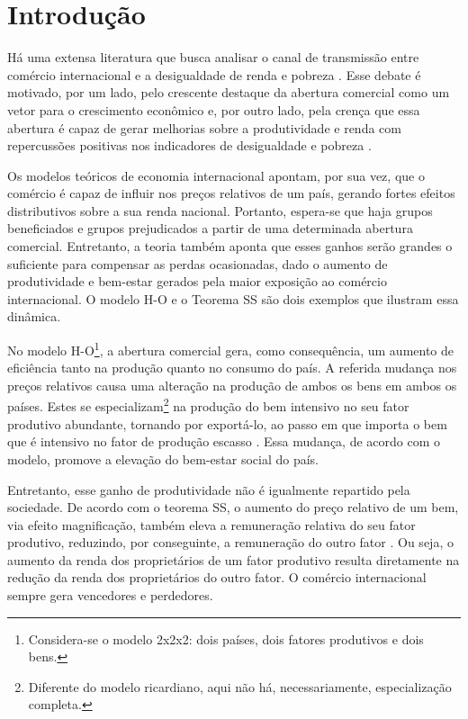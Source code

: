 

\chapter{Introdução} \label{cha:introducao}

Há uma extensa literatura que busca analisar o canal de transmissão entre comércio internacional e a desigualdade de renda e pobreza \cite{ferreira06, castilho12, bayar17, anderson20}. Esse debate é motivado, por um lado, pelo crescente destaque da abertura comercial como um vetor para o crescimento econômico \cite{atkin22} e, por outro lado, pela crença que essa abertura é capaz de gerar melhorias sobre a produtividade e renda com repercussões positivas nos indicadores de desigualdade e pobreza \cite{carneiro06}.

Os modelos teóricos de economia internacional apontam, por sua vez, que o comércio é capaz de influir nos preços relativos de um país, gerando fortes efeitos distributivos sobre a sua renda nacional. Portanto, espera-se que haja grupos beneficiados e grupos prejudicados a partir de uma determinada abertura comercial. Entretanto, a teoria também aponta que esses ganhos serão grandes o suficiente para compensar as perdas ocasionadas, dado o aumento de produtividade e bem-estar gerados pela maior exposição ao comércio internacional. O modelo H-O \cite{heckscher49, ohlin67} e o Teorema SS \cite{stolper41} são dois exemplos que ilustram essa dinâmica.

No modelo H-O\footnote{Considera-se o modelo 2x2x2: dois países, dois fatores produtivos e dois bens.}, a abertura comercial gera, como consequência, um aumento de eficiência tanto na produção quanto no consumo do país. A referida mudança nos preços relativos causa uma alteração na produção de ambos os bens em ambos os países. Estes se especializam\footnote{Diferente do modelo ricardiano, aqui não há, necessariamente, especialização completa.} na produção do bem intensivo no seu fator produtivo abundante, tornando por exportá-lo, ao passo em que importa o bem que é intensivo no fator de produção escasso \cite{heckscher49, ohlin67}. Essa mudança, de acordo com o modelo, promove a elevação do bem-estar social do país.

Entretanto, esse ganho de produtividade não é igualmente repartido pela sociedade. De acordo com o teorema SS, o aumento do preço relativo de um bem, via efeito magnificação, também eleva a remuneração relativa do seu fator produtivo, reduzindo, por conseguinte, a remuneração do outro fator \cite{stolper41}. Ou seja, o aumento da renda dos proprietários de um fator produtivo resulta diretamente na redução da renda dos proprietários do outro fator. O comércio internacional sempre gera vencedores e perdedores.

